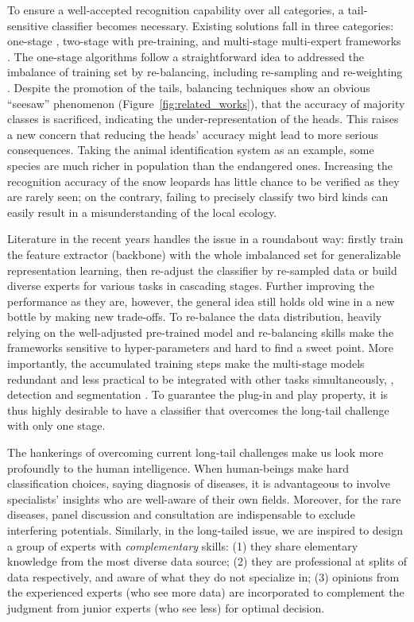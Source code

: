 To ensure a well-accepted recognition capability over all categories, a tail-sensitive classifier becomes necessary. Existing solutions fall in three categories: one-stage \cite{Huang_2016_CVPR, wang2017learning}, two-stage with pre-training\cite{kang2019decoupling, cao2019learning}, and multi-stage multi-expert frameworks \cite{xiang2020learning, wang2020long}. The one-stage algorithms follow a straightforward idea to addressed the imbalance of training set by re-balancing, including re-sampling \cite{kang2019decoupling} and re-weighting \cite{cao2019learning, cui2019class, zhang2017range}. Despite the promotion of the tails, balancing techniques show an obvious ``seesaw'' phenomenon (Figure~\ref{fig:related_works}), that the accuracy of majority classes is sacrificed, indicating the under-representation of the heads. This raises a new concern that reducing the heads' accuracy might lead to more serious consequences. Taking the animal identification system as an example, some species are much richer in population than the endangered ones. Increasing the recognition accuracy of the snow leopards has little chance to be verified as they are rarely seen; on the contrary, failing to precisely classify two bird kinds can easily result in a misunderstanding of the local ecology. 

Literature in the recent years \cite{kang2019decoupling, wang2020long, xiang2020learning, zhang2021bag} handles the issue in a roundabout way: firstly train the feature extractor (backbone) with the whole imbalanced set for generalizable representation learning, then re-adjust the classifier by re-sampled data or build diverse experts for various tasks in cascading stages. Further improving the performance as they are, however, the general idea still holds old wine in a new bottle by making new trade-offs. To re-balance the data distribution, heavily relying on the well-adjusted pre-trained model and re-balancing skills make the frameworks sensitive to hyper-parameters and hard to find a sweet point. More importantly, the accumulated training steps make the multi-stage models redundant and less practical to be integrated with other tasks simultaneously, \eg, detection \cite{wang2020devil} and segmentation \cite{zang2021fasa}. To guarantee the plug-in and play property, it is thus highly desirable to have a classifier that overcomes the long-tail challenge with only one stage.

The hankerings of overcoming current long-tail challenges make us look more profoundly to the human intelligence. When human-beings make hard classification choices, saying diagnosis of diseases, it is advantageous to involve specialists’ insights who are well-aware of their own fields. Moreover, for the rare diseases, panel discussion and consultation are indispensable to exclude interfering potentials. Similarly, in the long-tailed issue, we are inspired to design a group of experts with \textit{complementary} skills: (1) they share elementary knowledge from the most diverse data source; (2) they are professional at splits of data respectively, and aware of what they do not specialize in; (3) opinions from the experienced experts (who see more data) are incorporated to complement the judgment from junior experts (who see less) for optimal decision.

